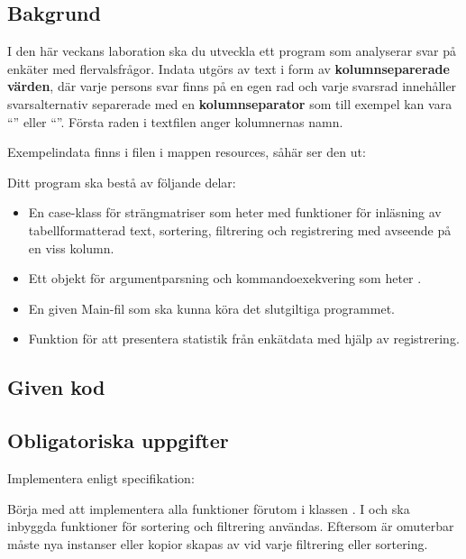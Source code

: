 \subsection{Bakgrund}

I den här veckans laboration ska du utveckla ett program som analyserar svar på enkäter med flervalsfrågor. Indata utgörs av text i form av \textbf{kolumnseparerade värden}, där varje persons svar finns på en egen rad och varje svarsrad innehåller svarsalternativ separerade med en \textbf{kolumnseparator} som till exempel kan vara ``\code{\t}'' eller ``\code{,}''. Första raden i textfilen anger kolumnernas namn.

Exempelindata finns i filen  i mappen resources, såhär ser den ut:


Ditt program ska bestå av följande delar:
\begin{itemize}
\item En case-klass för strängmatriser som heter  med funktioner för inläsning av tabellformatterad text, sortering, filtrering och registrering med avseende på en viss kolumn.
\item Ett objekt för argumentparsning och kommandoexekvering som heter .
\item En given Main-fil som ska kunna köra det slutgiltiga programmet.
\item Funktion för att presentera statistik från enkätdata med hjälp av registrering.
\end{itemize}

\subsection{Given kod}



\subsection{Obligatoriska uppgifter}

\Task Implementera  enligt specifikation:


\Subtask Börja med att implementera alla funktioner förutom  i klassen . I  och  ska inbyggda funktioner för sortering och filtrering användas. Eftersom  är omuterbar måste nya instanser eller kopior skapas av  vid varje filtrering eller sortering.

